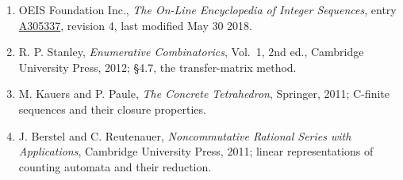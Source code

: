 \documentclass[11pt]{article}
\theoremstyle{definition}
\begin{document}
\begin{enumerate}

\item OEIS Foundation Inc., \emph{The On-Line Encyclopedia of Integer Sequences}, entry \href{https://oeis.org/A305337}{A305337}, revision 4, last modified May 30 2018.

\item R. P. Stanley, \emph{Enumerative Combinatorics}, Vol.~1, 2nd ed., Cambridge University Press, 2012; \S4.7, the transfer-matrix method.

\item M. Kauers and P. Paule, \emph{The Concrete Tetrahedron}, Springer, 2011; C-finite sequences and their closure properties.

\item J. Berstel and C. Reutenauer, \emph{Noncommutative Rational Series with Applications}, Cambridge University Press, 2011; linear representations of counting automata and their reduction.

\end{enumerate}
\end{document}

